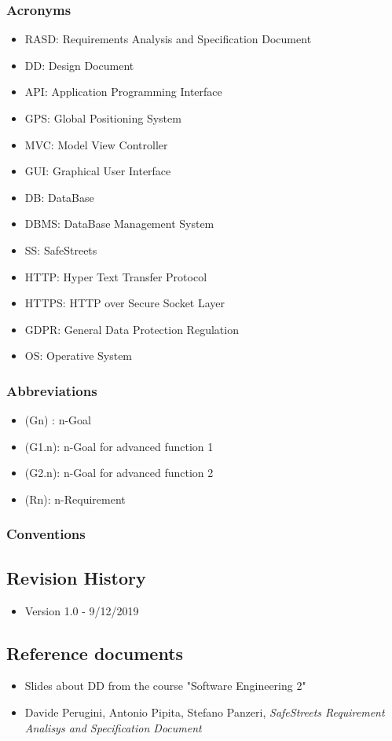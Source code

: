 \subsubsection{Acronyms}
\begin{itemize}
	\item RASD: Requirements Analysis and Specification Document
	\item DD: Design Document
	\item API: Application Programming Interface
	\item GPS: Global Positioning System
	\item MVC: Model View Controller
	\item GUI: Graphical User Interface
	\item DB: DataBase
	\item DBMS: DataBase Management System
	\item SS: SafeStreets
	\item HTTP: Hyper Text Transfer Protocol
	\item HTTPS: HTTP over Secure Socket Layer
	\item GDPR: General Data Protection Regulation
	\item OS: Operative System
\end{itemize}
\subsubsection{Abbreviations}
\begin{itemize}
	\item (Gn) : n-Goal
	\item (G1.n): n-Goal for advanced function 1
	\item (G2.n): n-Goal for advanced function 2
	\item (Rn): n-Requirement
\end{itemize}
\subsubsection{Conventions}
\subsection{Revision History}
\begin{itemize}
	\item Version 1.0 - 9/12/2019
\end{itemize}
\subsection{Reference documents}
\begin{itemize}
	\item Slides about DD from the course "Software Engineering 2"
	\item Davide Perugini, Antonio Pipita, Stefano Panzeri, \textit{SafeStreets Requirement Analisys and Specification Document}
\end{itemize}
